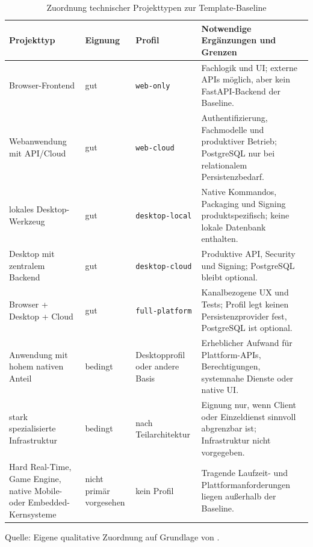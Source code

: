 \begin{table}[H]
  \centering
  \scriptsize
  \renewcommand{\arraystretch}{1.12}
  \caption{Zuordnung technischer Projekttypen zur Template-Baseline}
  \label{tab:project-suitability}
  \begin{tabularx}{\textwidth}{@{}>{\raggedright\arraybackslash}p{}>{\raggedright\arraybackslash}p{}>{\raggedright\arraybackslash}p{}>{\raggedright\arraybackslash}X@{}}
    \toprule
    \textbf{Projekttyp} & \textbf{Eignung} & \textbf{Profil} & \textbf{Notwendige Ergänzungen und Grenzen} \\
    \midrule
    Browser-Frontend & gut & \texttt{web-only}
      & Fachlogik und UI; externe APIs möglich, aber kein FastAPI-Backend der Baseline. \\
    Webanwendung mit API/Cloud & gut & \texttt{web-cloud}
      & Authentifizierung, Fachmodelle und produktiver Betrieb; PostgreSQL nur bei relationalem Persistenzbedarf. \\
    lokales Desktop-Werkzeug & gut & \texttt{desktop-local}
      & Native Kommandos, Packaging und Signing produktspezifisch; keine lokale Datenbank enthalten. \\
    Desktop mit zentralem Backend & gut & \texttt{desktop-cloud}
      & Produktive API, Security und Signing; PostgreSQL bleibt optional. \\
    Browser + Desktop + Cloud & gut & \texttt{full-platform}
      & Kanalbezogene UX und Tests; Profil legt keinen Persistenzprovider fest, PostgreSQL ist optional. \\
    Anwendung mit hohem nativen Anteil & bedingt & Desktopprofil oder andere Basis
      & Erheblicher Aufwand für Plattform-APIs, Berechtigungen, systemnahe Dienste oder native UI. \\
    stark spezialisierte Infrastruktur & bedingt & nach Teilarchitektur
      & Eignung nur, wenn Client oder Einzeldienst sinnvoll abgrenzbar ist; Infrastruktur nicht vorgegeben. \\
    Hard Real-Time, Game Engine, native Mobile- oder Embedded-Kernsysteme
      & nicht primär vorgesehen & kein Profil
      & Tragende Laufzeit- und Plattformanforderungen liegen außerhalb der Baseline. \\
    \bottomrule
  \end{tabularx}
  \smallskip
  {\footnotesize Quelle: Eigene qualitative Zuordnung auf Grundlage von
  \textcite{kleiveist2026profiles,kleiveist2026persistence,kleiveist2026acceptance}.\par}
\end{table}
